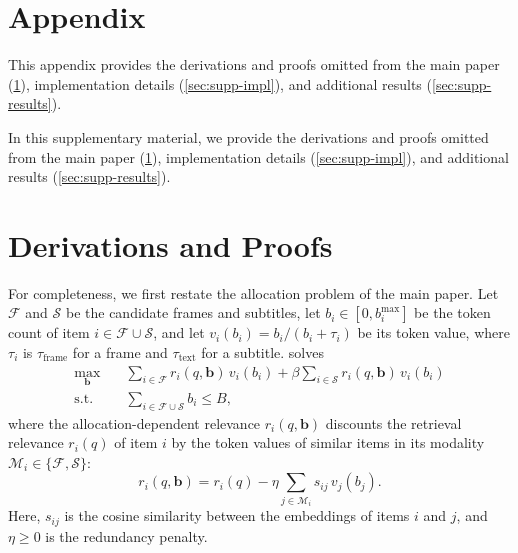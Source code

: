 \providecommand{\mainpaper}{main paper}
\ifdefined\appendixmode
  \appendix
  \section*{Appendix}
  This appendix provides the derivations and proofs omitted from the \mainpaper{} (\cref{sec:supp-proofs}), implementation details (\cref{sec:supp-impl}), and additional results (\cref{sec:supp-results}).
\else
  \maketitlesupplementary
  \setcounter{figure}{8}\setcounter{table}{3}\setcounter{equation}{11}
  \setcounter{section}{0}\renewcommand{\thesection}{\Alph{section}}

  In this supplementary material, we provide the derivations and proofs omitted from the \mainpaper{} (\cref{sec:supp-proofs}), implementation details (\cref{sec:supp-impl}), and additional results (\cref{sec:supp-results}).
\fi
\raggedbottom  %
\renewcommand{\qedsymbol}{}\renewcommand{\qed}{}  %

\section{Derivations and Proofs}
\label{sec:supp-proofs}

For completeness, we first restate the allocation problem of the \mainpaper. Let $\mathcal F$ and $\mathcal S$ be the candidate frames and subtitles, let $b_i\in[0,b_i^{\max}]$ be the token count of item $i\in\mathcal F\cup\mathcal S$, and let $v_i(b_i)=b_i/(b_i+\tau_i)$ be its token value, where $\tau_i$ is $\tau_{\text{frame}}$ for a frame and $\tau_{\text{text}}$ for a subtitle. \name solves
\begin{equation}
\begin{aligned}
  \max_{\mathbf b}\quad & \sum_{i\in\mathcal F} r_i(q,\mathbf b)\,v_i(b_i)+\beta\sum_{i\in\mathcal S} r_i(q,\mathbf b)\,v_i(b_i)\\
  \text{s.t.}\quad & \sum_{i\in\mathcal F\cup\mathcal S} b_i\le B ,
\end{aligned}
\label{eq:supp-allocation}
\end{equation}
where the allocation-dependent relevance $r_i(q,\mathbf b)$ discounts the retrieval relevance $r_i(q)$ of item $i$ by the token values of similar items in its modality $\mathcal M_i\in\{\mathcal F,\mathcal S\}$:
\begin{equation}
  r_i(q,\mathbf b)=r_i(q)-\eta\sum_{j\in\mathcal M_i}s_{ij}\,v_j(b_j) .
\label{eq:supp-cond}
\end{equation}
Here, $s_{ij}$ is the cosine similarity between the embeddings of items $i$ and $j$, and $\eta\ge0$ is the redundancy penalty.

